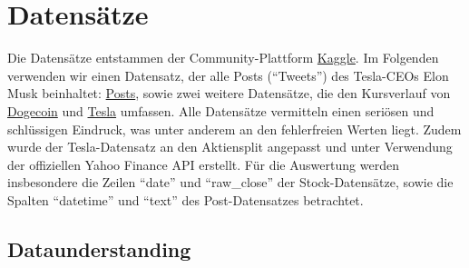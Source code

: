 \documentclass{article}
\begin{document}
\section{Datensätze}
Die Datensätze entstammen der Community-Plattform \href{https://www.kaggle.com/datasets/dhruvildave/dogecoin-historical-data}{Kaggle}.
Im Folgenden verwenden wir einen Datensatz, der alle Posts (``Tweets'') des Tesla-CEOs Elon Musk  beinhaltet: \href{https://www.kaggle.com/datasets/aryansingh0909/elon-musk-tweets-updated-daily}{Posts}, sowie zwei weitere Datensätze, die den Kursverlauf von \href{https://www.kaggle.com/datasets/dhruvildave/dogecoin-historical-datay}{Dogecoin} und \href{https://www.kaggle.com/datasets/dhruvildave/dogecoin-historical-datay}{Tesla} umfassen.
Alle Datensätze vermitteln einen seriösen und schlüssigen Eindruck, was unter anderem an den fehlerfreien Werten liegt.
Zudem wurde der Tesla-Datensatz an den Aktiensplit angepasst und unter Verwendung der offiziellen Yahoo Finance API erstellt.
Für die Auswertung werden insbesondere die Zeilen ``date'' und ``raw\_close'' der Stock-Datensätze, sowie die Spalten ``datetime'' und ``text'' des Post-Datensatzes betrachtet.

\subsection{Dataunderstanding}
\end{document}
